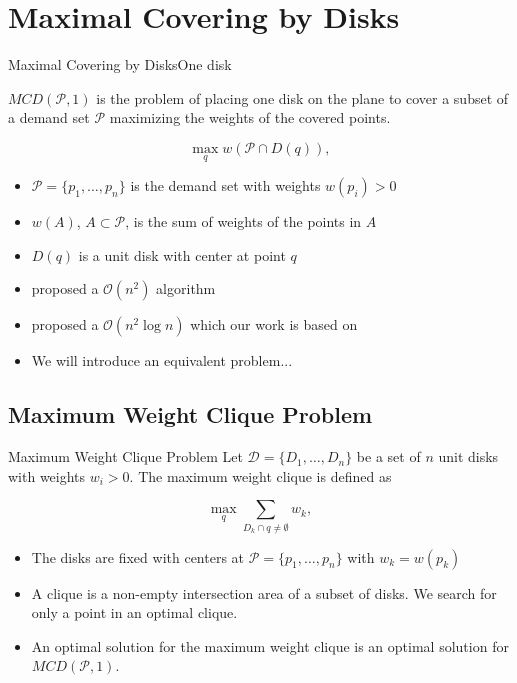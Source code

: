 \documentclass{beamer}
\newcommand{\D}{\mathscr{D}}
\newcommand{\Pp}{\mathscr{P}}
\newcommand{\bigO}{\mathscr{O}}
\begin{document}
\section{Maximal Covering by Disks}
\begin{frame}{Maximal Covering by Disks}{One disk}
	
	$MCD(\Pp, 1)$ is the problem of placing one disk on the plane to cover a subset of a demand set $\Pp$ maximizing the weights of the covered points.
	
	\begin{equation*}\label{eq:max_one_disk}
		\max_q w(\Pp \cap D(q)),
	\end{equation*}
	
	\begin{itemize}
		\item $\Pp=\{p_1,\dots,p_n\}$ is the demand set with weights $w(p_i)>0$
		\item $w(A)$, $A\subset \Pp$, is the sum of weights of the points in $A$
		\item $D(q)$ is a unit disk with center at point $q$
		\item \cite{chazelle:1986} proposed a $\bigO(n^2)$ algorithm
		\item \cite{drezner} proposed a $\bigO(n^2\log{n})$ which our work is based on
		\item We will introduce an equivalent problem...
	\end{itemize}
\end{frame}

\subsection{Maximum Weight Clique Problem}
\begin{frame}{Maximum Weight Clique Problem}
	Let $\D=\{D_1,\dots,D_n\}$ be a set of $n$ unit disks with weights $w_i>0$. The maximum weight clique is defined as
	
	\begin{equation*}
	\max_q \sum_{D_k \cap q \neq \emptyset} w_k,
	\end{equation*}
	
	\begin{itemize}
		\item The disks are fixed with centers at $\Pp =\{p_1,\dots,p_n\}$ with $w_k=w(p_k)$
		\item A clique is a non-empty intersection area of a subset of disks. We search for only a point in an optimal clique.
		\item An optimal solution for the maximum weight clique is an optimal solution for $MCD(\Pp,1)$.
	\end{itemize}
\end{frame}
\end{document}

